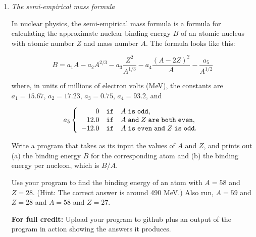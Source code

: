 \documentclass[12pt]{article}
\begin{document}
\begin{enumerate}
\item {\it The semi-empirical mass formula}

In nuclear physics, the semi-empirical mass formula is a formula for
calculating the approximate nuclear binding energy $B$ of an atomic
nucleus with atomic number $Z$ and mass number $A$. The formula looks
like this:

\begin{equation}
B = a_1 A - a_2 A^{2/3} - a_3 \frac{Z^2}{A^{1/3}} - a_4 \frac{(A - 2Z)^2}{A} - \frac{a_5}{A^{1/2}} 
\end{equation}

where, in units of millions of electron volts (MeV), the constants are $a_1 =
15.67$, $a_2 = 17.23$, $a_3 = 0.75$, $a_4 = 93.2$, and

\[ a_5 \left\{ \begin{array} {r@{\quad\tt if \quad}l} 0 & A \;{\tt is
      \; odd}, \\
    12.0 & A \;{\tt and}\; Z \;{\tt are \;both \;even}, \\ -12.0 & A \;{\tt is
     \;  even \; and}\;  Z \;{\tt is
  \;  odd.} \end{array} \right. \]

Write a program that takes as its input the values of $A$ and $Z$, and
prints out (a) the binding energy $B$ for the corresponding atom and (b)
the binding energy per nucleon, which is $B/A$. 

Use your program to find
the binding energy of an atom with $A = 58$ and $Z = 28$. (Hint: The
correct answer is around 490 MeV.) 
Also run,  $A = 59$ and $Z = 28$ and $A = 58$ and $Z = 27$.

{\bf For full credit:} Upload your program to github plus an output of the program in action showing the answers it produces.



\end{enumerate}
\end{document}
